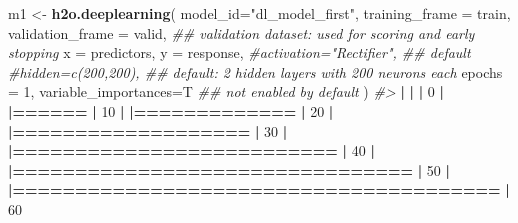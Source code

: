 \documentclass[]{book}
\newenvironment{Shaded}{\begin{snugshade}}{\end{snugshade}}
\newcommand{\CommentTok}[1]{\textcolor[rgb]{0.56,0.35,0.01}{\textit{#1}}}
\newcommand{\DataTypeTok}[1]{\textcolor[rgb]{0.13,0.29,0.53}{#1}}
\newcommand{\DecValTok}[1]{\textcolor[rgb]{0.00,0.00,0.81}{#1}}
\newcommand{\ErrorTok}[1]{\textcolor[rgb]{0.64,0.00,0.00}{\textbf{#1}}}
\newcommand{\KeywordTok}[1]{\textcolor[rgb]{0.13,0.29,0.53}{\textbf{#1}}}
\newcommand{\NormalTok}[1]{#1}
\newcommand{\OperatorTok}[1]{\textcolor[rgb]{0.81,0.36,0.00}{\textbf{#1}}}
\newcommand{\StringTok}[1]{\textcolor[rgb]{0.31,0.60,0.02}{#1}}
\begin{document}
\begin{Shaded}
\begin{Highlighting}[]
\NormalTok{m1 <-}\StringTok{ }\KeywordTok{h2o.deeplearning}\NormalTok{(}
  \DataTypeTok{model_id=}\StringTok{"dl_model_first"}\NormalTok{, }
  \DataTypeTok{training_frame =}\NormalTok{ train, }
  \DataTypeTok{validation_frame =}\NormalTok{ valid,   }\CommentTok{## validation dataset: used for scoring and early stopping}
  \DataTypeTok{x =}\NormalTok{ predictors,}
  \DataTypeTok{y =}\NormalTok{ response,}
  \CommentTok{#activation="Rectifier",  ## default}
  \CommentTok{#hidden=c(200,200),       ## default: 2 hidden layers with 200 neurons each}
  \DataTypeTok{epochs =} \DecValTok{1}\NormalTok{,}
  \DataTypeTok{variable_importances=}\NormalTok{T    }\CommentTok{## not enabled by default}
\NormalTok{)}
\CommentTok{#> }
  \OperatorTok{|}\StringTok{                                                                       }
\StringTok{  }\ErrorTok{|}\StringTok{                                                                 }\ErrorTok{|}\StringTok{   }\DecValTok{0}\NormalTok{%}
  \OperatorTok{|}\StringTok{                                                                       }
\StringTok{  }\ErrorTok{|======}\StringTok{                                                           }\ErrorTok{|}\StringTok{  }\DecValTok{10}\NormalTok{%}
  \OperatorTok{|}\StringTok{                                                                       }
\StringTok{  }\ErrorTok{|=============}\StringTok{                                                    }\ErrorTok{|}\StringTok{  }\DecValTok{20}\NormalTok{%}
  \OperatorTok{|}\StringTok{                                                                       }
\StringTok{  }\ErrorTok{|===================}\StringTok{                                              }\ErrorTok{|}\StringTok{  }\DecValTok{30}\NormalTok{%}
  \OperatorTok{|}\StringTok{                                                                       }
\StringTok{  }\ErrorTok{|==========================}\StringTok{                                       }\ErrorTok{|}\StringTok{  }\DecValTok{40}\NormalTok{%}
  \OperatorTok{|}\StringTok{                                                                       }
\StringTok{  }\ErrorTok{|================================}\StringTok{                                 }\ErrorTok{|}\StringTok{  }\DecValTok{50}\NormalTok{%}
  \OperatorTok{|}\StringTok{                                                                       }
\StringTok{  }\ErrorTok{|=======================================}\StringTok{                          }\ErrorTok{|}\StringTok{  }\DecValTok{60}\NormalTok{%}
}}}}}}}
\end{Highlighting}
\end{Shaded}
\end{document}
